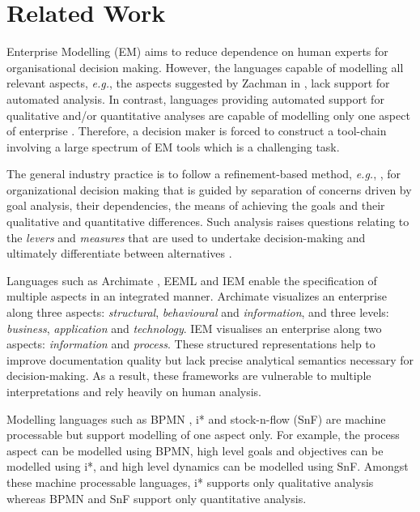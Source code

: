 \documentclass[10pt,numbers]{sigplanconf}
\begin{document}
\section{Related Work}

\label{sec:related_work}

Enterprise Modelling (EM) \cite{vernadat2002ueml} aims to reduce dependence on human experts for organisational decision making. However, the languages capable of modelling all relevant aspects, {\it e.g.}, the aspects suggested by Zachman in \cite{zachman1987framework}, lack support for automated analysis. In contrast, languages providing automated support for qualitative and/or quantitative analyses are capable of modelling only one aspect of enterprise \cite{barjis2010relevance}. Therefore, a decision maker is forced to construct a tool-chain involving a large spectrum of EM tools \cite{camus2015combining} which is a challenging task.

The general industry practice is to follow a refinement-based method, {\it e.g.}, \cite{mintzberg1976structure}, for organizational decision making that is guided by separation of concerns driven by goal analysis, their dependencies, the means of achieving the goals and their qualitative and quantitative differences. Such analysis raises questions relating to the {\it levers} and {\it measures} that are used to undertake decision-making and ultimately differentiate between alternatives \cite{cyert1963behavioral,mintzberg1976structure}.

Languages such as Archimate \cite{iacobstate}, EEML \cite{krogstie2008using} and IEM \cite{bernus2013handbook} enable the specification of multiple aspects in an integrated manner. Archimate visualizes an enterprise along three aspects: {\it structural}, {\it behavioural} and {\it information}, and three levels: {\it business}, {\it application} and {\it technology}. IEM visualises an enterprise along two aspects: {\it information} and {\it process}. These structured representations help to improve documentation quality but lack precise analytical semantics necessary for decision-making. As a result, these frameworks are vulnerable to multiple interpretations and rely heavily on human analysis.

Modelling languages such as BPMN \cite{white2004business}, i* \cite{yu2006exploring} and stock-n-flow (SnF) \cite{meadows2008thinking} are machine processable but support modelling of one aspect only. For example, the process aspect can be modelled using BPMN, high level goals and objectives can be modelled using i*, and high level dynamics can be modelled using SnF. Amongst these machine processable languages, i* supports only qualitative analysis whereas BPMN and SnF support only quantitative analysis. 
\end{document}
